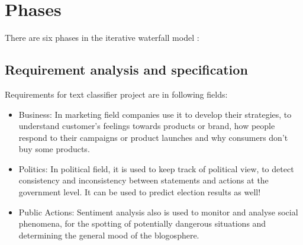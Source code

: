 \section{Phases}
There are six phases in the iterative waterfall model :
\subsection{Requirement analysis and specification}
Requirements for text classifier project are in following fields:
\begin{itemize}
	\item Business: In marketing field companies use it to develop their strategies, to understand customer's feelings towards products or brand, how people respond to their campaigns or product launches and why consumers don’t buy some products.
	\item Politics: In political field, it is used to keep track of political view, to detect consistency and inconsistency between statements and actions at the government level. It can be used to predict election results as well!
	\item Public Actions: Sentiment analysis also is used to monitor and analyse social phenomena, for the spotting of potentially dangerous situations and determining the general mood of the blogosphere.
\end{itemize}
